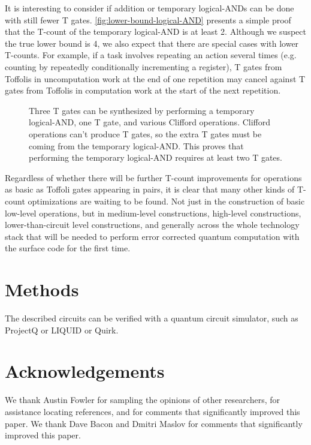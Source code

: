 \documentclass[twocolumn]{revtex4-1}
\begin{document}
It is interesting to consider if addition or temporary logical-ANDs can be done with still fewer T gates.
\autoref{fig:lower-bound-logical-AND} presents a simple proof that the T-count of the temporary logical-AND is at least 2.
Although we suspect the true lower bound is 4, we also expect that there are special cases with lower T-counts.
For example, if a task involves repeating an action several times (e.g. counting by repeatedly conditionally incrementing a register), T gates from Toffolis in uncomputation work at the end of one repetition may cancel against T gates from Toffolis in computation work at the start of the next repetition.

\begin{figure}
  
  \caption{
	Three T gates can be synthesized by performing a temporary logical-AND, one T gate, and various Clifford operations.
	Clifford operations can't produce T gates, so the extra T gates must be coming from the temporary logical-AND.
	This proves that performing the temporary logical-AND requires at least two T gates.
  }
  \label{fig:lower-bound-logical-AND}
\end{figure}

Regardless of whether there will be further T-count improvements for operations as basic as Toffoli gates appearing in pairs, it is clear that many other kinds of T-count optimizations are waiting to be found.
Not just in the construction of basic low-level operations, but in medium-level constructions, high-level constructions, lower-than-circuit level constructions, and generally across the whole technology stack that will be needed to perform error corrected quantum computation with the surface code for the first time.


\section*{Methods}

The described circuits can be verified with a quantum circuit simulator, such as ProjectQ or LIQUID or Quirk.


\section*{Acknowledgements}

We thank Austin Fowler for sampling the opinions of other researchers, for assistance locating references, and for comments that significantly improved this paper.
We thank Dave Bacon and Dmitri Maslov for comments that significantly improved this paper.
\end{document}
